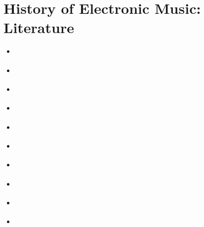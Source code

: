 
\chapter{History of Electronic Music: Literature}
\label{literature}

\begin{itemize}

\item \citep{boulanger2000csound}
\item \citep{chadabe1997electric}
\item \citep{emmerson07}
\item \citep{emmersonsmalleygrove2001}
\item \citep{emmerson1986language}
\item \citep{emmerson2000music}
\item \citep{manning2013electronic}
\item \citep{roads1996computer}
\item \citep{russolo1986art}
\item \citep{born1995rationalizing}


\end{itemize}
